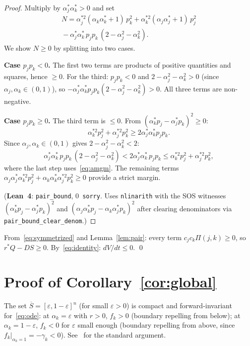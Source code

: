 \documentclass[11pt,a4paper]{article}
\theoremstyle{definition}
\begin{document}
\begin{proof}
Multiply by $\alpha_j^*\alpha_k^* > 0$ and set
\begin{multline*}
N = \alpha_j^{*2}(\alpha_k\alpha_k^*+1)\,p_k^2 + \alpha_k^{*2}(\alpha_j\alpha_j^*+1)\,p_j^2 \\
{} - \alpha_j^*\alpha_k^*\,p_jp_k\,(2 - \alpha_j^2 - \alpha_k^2).
\end{multline*}
We show $N \geq 0$ by splitting into two cases.

\smallskip\noindent\textbf{Case $p_jp_k < 0$.} The first two terms are products of positive quantities and squares, hence $\geq 0$. For the third: $p_jp_k < 0$ and $2-\alpha_j^2-\alpha_k^2 > 0$ (since $\alpha_j, \alpha_k \in (0,1)$), so $-\alpha_j^*\alpha_k^*p_jp_k(2-\alpha_j^2-\alpha_k^2) > 0$. All three terms are non-negative.

\smallskip\noindent\textbf{Case $p_jp_k \geq 0$.} The third term is $\leq 0$. From $(\alpha_k^*p_j - \alpha_j^*p_k)^2 \geq 0$:
\begin{equation}\label{eq:amgm}
\alpha_k^{*2}p_j^2 + \alpha_j^{*2}p_k^2 \geq 2\alpha_j^*\alpha_k^*p_jp_k.
\end{equation}
Since $\alpha_j, \alpha_k \in (0,1)$ gives $2-\alpha_j^2-\alpha_k^2 < 2$:
\[
\alpha_j^*\alpha_k^*\,p_jp_k\,(2-\alpha_j^2-\alpha_k^2) < 2\alpha_j^*\alpha_k^*\,p_jp_k \leq \alpha_k^{*2}p_j^2 + \alpha_j^{*2}p_k^2,
\]
where the last step uses~\eqref{eq:amgm}. The remaining terms $\alpha_j\alpha_j^*\alpha_k^{*2}p_j^2 + \alpha_k\alpha_k^*\alpha_j^{*2}p_k^2 \geq 0$ provide a strict margin.

(\textbf{Lean~4}: \texttt{pair\_bound}, 0~\texttt{sorry}. Uses \texttt{nlinarith} with the SOS witnesses $(\alpha_k^*p_j - \alpha_j^*p_k)^2$ and $(\alpha_j\alpha_k^*p_j - \alpha_k\alpha_j^*p_k)^2$ after clearing denominators via \texttt{pair\_bound\_clear\_denom}.)
\end{proof}

From~\eqref{eq:symmetrized} and Lemma~\ref{lem:pair}: every term $c_jc_k\Pi(j,k) \geq 0$, so $r^*Q - DS \geq 0$. By~\eqref{eq:identity}: $dV/dt \leq 0$. \qed

\section{Proof of Corollary~\ref{cor:global}}

The set $\overline{S} = [\varepsilon, 1-\varepsilon]^n$ (for small $\varepsilon > 0$) is compact and forward-invariant for~\eqref{eq:ode}: at $\alpha_k = \varepsilon$ with $r > 0$, $f_k > 0$ (boundary repelling from below); at $\alpha_k = 1-\varepsilon$, $f_k < 0$ for $\varepsilon$ small enough (boundary repelling from above, since $f_k|_{\alpha_k=1} = -\gamma_k < 0$). See~\cite{smith1995} for the standard argument.
\end{document}
